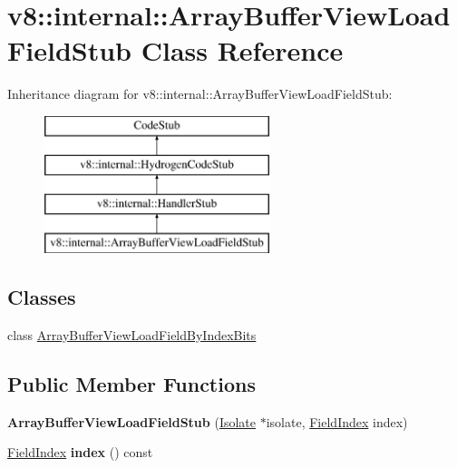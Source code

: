 \hypertarget{classv8_1_1internal_1_1_array_buffer_view_load_field_stub}{}\section{v8\+:\+:internal\+:\+:Array\+Buffer\+View\+Load\+Field\+Stub Class Reference}
\label{classv8_1_1internal_1_1_array_buffer_view_load_field_stub}
Inheritance diagram for v8\+:\+:internal\+:\+:Array\+Buffer\+View\+Load\+Field\+Stub\+:\begin{figure}[H]
\begin{center}
\leavevmode
\includegraphics[height=4.000000cm]{classv8_1_1internal_1_1_array_buffer_view_load_field_stub}
\end{center}
\end{figure}
\subsection*{Classes}
\begin{DoxyCompactItemize}
\item 
class \hyperlink{classv8_1_1internal_1_1_array_buffer_view_load_field_stub_1_1_array_buffer_view_load_field_by_index_bits}{Array\+Buffer\+View\+Load\+Field\+By\+Index\+Bits}
\end{DoxyCompactItemize}
\subsection*{Public Member Functions}
\begin{DoxyCompactItemize}
\item 
{\bfseries Array\+Buffer\+View\+Load\+Field\+Stub} (\hyperlink{classv8_1_1internal_1_1_isolate}{Isolate} $\ast$isolate, \hyperlink{classv8_1_1internal_1_1_field_index}{Field\+Index} index)\hypertarget{classv8_1_1internal_1_1_array_buffer_view_load_field_stub_a0712272b3d94ef2749e269e4adfc9d0d}{}\label{classv8_1_1internal_1_1_array_buffer_view_load_field_stub_a0712272b3d94ef2749e269e4adfc9d0d}

\item 
\hyperlink{classv8_1_1internal_1_1_field_index}{Field\+Index} {\bfseries index} () const \hypertarget{classv8_1_1internal_1_1_array_buffer_view_load_field_stub_ae581bb5979908a062ba2f8055531c0a1}{}\label{classv8_1_1internal_1_1_array_buffer_view_load_field_stub_ae581bb5979908a062ba2f8055531c0a1}

\end{DoxyCompactItemize}
